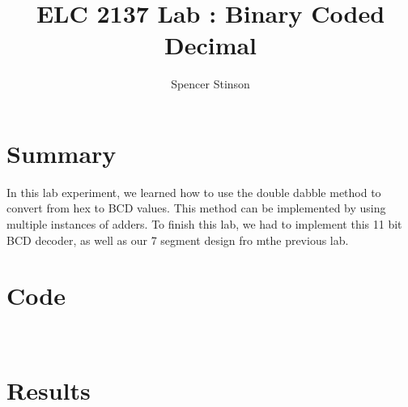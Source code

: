 \documentclass[11pt]{article}
\newcommand{\Verilog}[2][]{%
	
}
\begin{document}
\title{ELC 2137 Lab : Binary Coded Decimal }
\author{Spencer Stinson}
\maketitle
\section*{Summary}
In this lab experiment, we learned how to use the double dabble method to convert from hex to BCD values. This method can be implemented by using multiple instances of adders. To finish this lab, we had to implement this 11 bit BCD decoder, as well as our 7 segment design fro mthe previous lab. 

\section*{Code}\\

\Verilog[caption= add3 code ]{C:/Users/spencer_stinson1/Documents/GitHub/Lab07/Lab07/Lab07.srcs/sources_1/new/add3.sv}
\Verilog[caption= double dabble 6 bit code]{C:/Users/spencer_stinson1/Documents/GitHub/Lab07/Lab07/Lab07.srcs/sources_1/new/dd6b.sv}
\Verilog[caption= double dabble 11 bit code ]{C:/Users/spencer_stinson1/Documents/GitHub/Lab07/Lab07/Lab07.srcs/sources_1/new/dd11b.sv}
\Verilog[caption=7 segment BCD code]{C:/Users/spencer_stinson1/Documents/GitHub/Lab07/Lab07/Lab07.srcs/sources_1/new/sseg1_bcd.sv}
\Verilog[caption= testbench for add3 code]{C:/Users/spencer_stinson1/Documents/GitHub/Lab07/Lab07/Lab07.srcs/sim_1/new/add3_testbench.sv}
\Verilog[caption= testbench for double dabble 6 bit code]{C:/Users/spencer_stinson1/Documents/GitHub/Lab07/Lab07/Lab07.srcs/sim_2/new/dd6b_testbench_.sv}
\Verilog[caption = testbench for double dabble 11 bit]{C:/Users/spencer_stinson1/Documents/GitHub/Lab07/Lab07/Lab07.srcs/sim_3/new/dd11b_testbench.sv}
\section*{Results}
\end{document}
